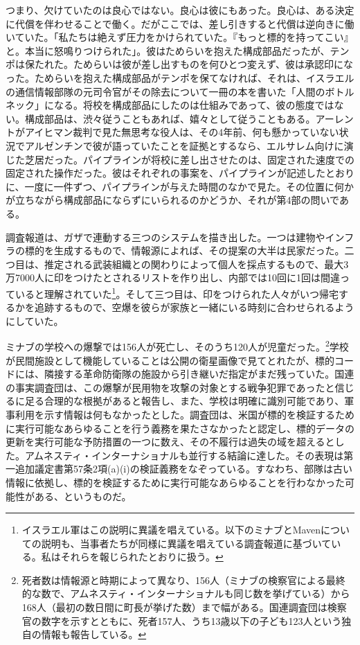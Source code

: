 つまり、欠けていたのは良心ではない。良心は彼にもあった。良心は、ある決定に代償を伴わせることで働く。だがここでは、差し引きすると代償は逆向きに働いていた。「私たちは絶えず圧力をかけられていた。『もっと標的を持ってこい』と。本当に怒鳴りつけられた」\autocite{abraham2024lavender}。彼はためらいを抱えた構成部品だったが、テンポは保たれた。ためらいは彼が差し出すものを何ひとつ変えず、彼は承認印になった。ためらいを抱えた構成部品がテンポを保てなければ、それは、イスラエルの通信情報部隊の元司令官がその除去について一冊の本を書いた「人間のボトルネック」になる\autocite{ys2021humanmachine}。将校を構成部品にしたのは仕組みであって、彼の態度ではない。構成部品は、渋々従うこともあれば、嬉々として従うこともある。アーレントがアイヒマン裁判で見た無思考な役人\autocite{arendt1963eichmann}は、その4年前、何も懸かっていない状況でアルゼンチンで彼が語っていたことを証拠とするなら、エルサレム向けに演じた芝居だった\autocite{stangneth2014eichmann}。パイプラインが将校に差し出させたのは、固定された速度での固定された操作だった。彼はそれぞれの事案を、パイプラインが記述したとおりに、一度に一件ずつ、パイプラインが与えた時間のなかで見た。その位置に何かが立ちながら構成部品にならずにいられるのかどうか、それが第4部の問いである。

調査報道は、ガザで連動する三つのシステムを描き出した。一つは建物やインフラの標的を生成するもので、情報源によれば、その提案の大半は民家だった。二つ目は、推定される武装組織との関わりによって個人を採点するもので、最大3万7000人に印をつけたとされるリストを作り出し、内部では10回に1回は間違っていると理解されていた\footnote{イスラエル軍はこの説明に異議を唱えている。以下のミナブとMavenについての説明も、当事者たちが同様に異議を唱えている調査報道に基づいている。私はそれらを報じられたとおりに扱う。}。そして三つ目は、印をつけられた人々がいつ帰宅するかを追跡するもので、空爆を彼らが家族と一緒にいる時刻に合わせられるようにしていた。


ミナブの学校への爆撃では156人が死亡し、そのうち120人が児童だった\autocite[第92段落]{UNFFMIran2026}。\footnote{死者数は情報源と時期によって異なり、156人（ミナブの検察官による最終的な数で、アムネスティ・インターナショナルも同じ数を挙げている）から168人（最初の数日間に町長が挙げた数）まで幅がある。国連調査団は検察官の数字を示すとともに、死者157人、うち13歳以下の子ども123人という独自の情報も報告している\autocite[第92–93段落]{UNFFMIran2026}。}学校が民間施設として機能していることは公開の衛星画像で見てとれたが、標的コードには、隣接する革命防衛隊の施設から引き継いだ指定がまだ残っていた。国連の事実調査団は、この爆撃が民用物を攻撃の対象とする戦争犯罪であったと信じるに足る合理的な根拠があると報告し\autocite{ohchr2026minabpress}、また、学校は明確に識別可能であり、軍事利用を示す情報は何もなかったとした\autocite[第81–86段落、第124–126段落]{UNFFMIran2026}。調査団は、米国が標的を検証するために実行可能なあらゆることを行う義務を果たさなかったと認定し、標的データの更新を実行可能な予防措置の一つに数え、その不履行は過失の域を超えるとした\autocite[第124–125段落]{UNFFMIran2026}。アムネスティ・インターナショナルも並行する結論に達した。その表現は第一追加議定書第57条2項(a)(i)の検証義務をなぞっている。すなわち、部隊は古い情報に依拠し、標的を検証するために実行可能なあらゆることを行わなかった可能性がある、というものだ\autocite{Amnesty2026Minab}。

